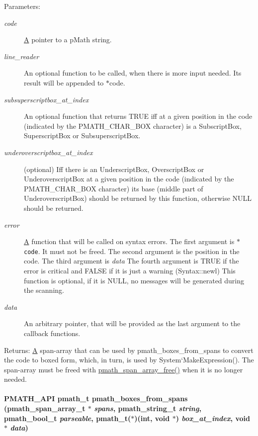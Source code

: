\begin{Desc}
\item[Parameters:]
\begin{description}
\item[{\em code}]\hyperlink{class_a}{A} pointer to a pMath string. \item[{\em line\_\-reader}]An optional function to be called, when there is more input needed. Its result will be appended to $\ast$code. \item[{\em subsuperscriptbox\_\-at\_\-index}]An optional function that returns TRUE iff at a given position in the code (indicated by the PMATH\_\-CHAR\_\-BOX character) is a SubscriptBox, SuperscriptBox or SubsuperscriptBox. \item[{\em underoverscriptbox\_\-at\_\-index}](optional) Iff there is an UnderscriptBox, OverscriptBox or UnderoverscriptBox at a given position in the code (indicated by the PMATH\_\-CHAR\_\-BOX character) its base (middle part of UnderoverscriptBox) should be returned by this function, otherwise NULL should be returned. \item[{\em error}]\hyperlink{class_a}{A} function that will be called on syntax errors. The first argument is {\tt $\ast$code}. It must not be freed. The second argument is the position in the code. The third argument is {\em data\/} The fourth argument is TRUE if the error is critical and FALSE if it is just a warning (Syntax::newl) This function is optional, if it is NULL, no messages will be generated during the scanning. \item[{\em data}]An arbitrary pointer, that will be provided as the last argument to the callback functions. \end{description}
\end{Desc}
\begin{Desc}
\item[Returns:]\hyperlink{class_a}{A} span-array that can be used by pmath\_\-boxes\_\-from\_\-spans to convert the code to boxed form, which, in turn, is used by System`MakeExpression(). The span-array must be freed with \hyperlink{group__parser_gceb05ef4c39c239d68f39e3b9bde5f1e}{pmath\_\-span\_\-array\_\-free()} when it is no longer needed. \end{Desc}
\hypertarget{group__parser_g2c9c96d98401746a9f19d7dc52255e0f}{
\paragraph[{pmath\_\-boxes\_\-from\_\-spans}]{\setlength{\rightskip}{0pt plus 5cm}PMATH\_\-API {\bf pmath\_\-t} pmath\_\-boxes\_\-from\_\-spans ({\bf pmath\_\-span\_\-array\_\-t} $\ast$ {\em spans}, \/  {\bf pmath\_\-string\_\-t} {\em string}, \/  {\bf pmath\_\-bool\_\-t} {\em parseable}, \/  {\bf pmath\_\-t}($\ast$)(int, void $\ast$) {\em box\_\-at\_\-index}, \/  void $\ast$ {\em data})}\hfill}
\label{group__parser_g2c9c96d98401746a9f19d7dc52255e0f}


